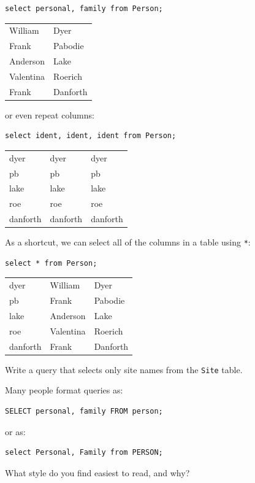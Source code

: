 \documentclass{book}
\begin{document}
\begin{verbatim}
select personal, family from Person;
\end{verbatim}

\begin{tabular}{ll}
William & Dyer \\
Frank & Pabodie \\
Anderson & Lake \\
Valentina & Roerich \\
Frank & Danforth \\
\end{tabular}

or even repeat columns:

\begin{verbatim}
select ident, ident, ident from Person;
\end{verbatim}

\begin{tabular}{lll}
dyer & dyer & dyer \\
pb & pb & pb \\
lake & lake & lake \\
roe & roe & roe \\
danforth & danforth & danforth \\
\end{tabular}

As a shortcut, we can select all of the columns in a table using
\texttt{*}:

\begin{verbatim}
select * from Person;
\end{verbatim}

\begin{tabular}{lll}
dyer & William & Dyer \\
pb & Frank & Pabodie \\
lake & Anderson & Lake \\
roe & Valentina & Roerich \\
danforth & Frank & Danforth \\
\end{tabular}

\begin{challenge}
  Write a query that selects only site names from the \texttt{Site}
  table.
\end{challenge}

\begin{challenge}
  Many people format queries as:

\begin{verbatim}
SELECT personal, family FROM person;
\end{verbatim}

  or as:

\begin{verbatim}
select Personal, Family from PERSON;
\end{verbatim}

  What style do you find easiest to read, and why?
\end{challenge}
\end{document}
